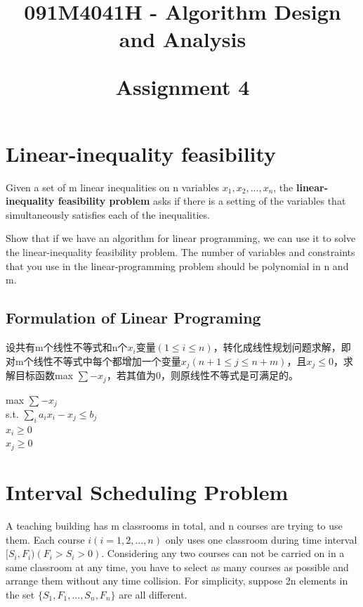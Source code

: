 \documentclass{article}
\begin{document}

\title{091M4041H - Algorithm Design and Analysis\\ [2ex] \begin{large} Assignment 4 \end{large}}


\maketitle

\tableofcontents

\newpage
\section{Linear-inequality feasibility}
Given a set of m linear inequalities on n variables $x_1,x_2,...,x_n$, the \textbf{linear-inequality feasibility problem} asks if there is a setting of the variables that simultaneously satisfies each of the inequalities. 

Show that if we have an algorithm for linear programming, we can use it to solve the linear-inequality feasibility problem. The number of variables and constraints that you use in the linear-programming problem should be polynomial in n and m.


\subsection{Formulation of Linear Programing}
设共有m个线性不等式和n个$x_i$变量$(1\leq i\leq n)$，转化成线性规划问题求解，即对m个线性不等式中每个都增加一个变量$x_j$$(n+1\leq j\leq n+m)$，且$x_j\leq0$，求解目标函数max $\sum-x_j$，若其值为0，则原线性不等式是可满足的。

\begin{center}
max $\sum-x_j$\\
s.t. $\sum_ia_{i}x_i -x_j \leq b_j$\\
$x_i \geq 0$\\
$x_j \geq 0$\\
\end{center} 



\newpage
\section{Interval Scheduling Problem}
A teaching building has m classrooms in total, and n courses are trying to use them. Each course $i (i = 1,2,... ,n)$ only uses one classroom during time interval $[S_i,F_i) (F_i > S_i > 0)$. Considering any two courses can not be carried on in a same classroom at any time, you have to select as many courses as possible and arrange them without any time collision. For simplicity, suppose 2n elements in the set $\{S_1,F_1,... ,S_n,F_n\}$ are all different.
\end{document}
